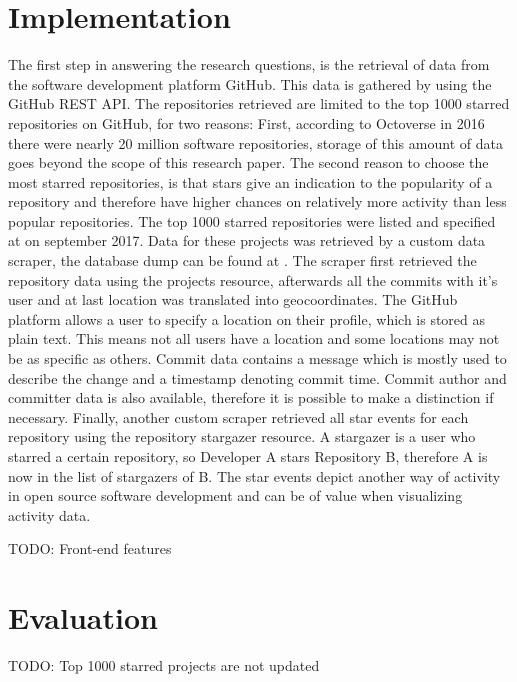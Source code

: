 \documentclass[acmtog, authorversion]{acmart}
\begin{document}
\section{Implementation}
The first step in answering the research questions, is the retrieval of data from the software development platform GitHub.
This data is gathered by using the GitHub REST API\cite{GHAPI}.
The repositories retrieved are limited to the top 1000 starred repositories on GitHub, for two reasons:
First, according to Octoverse \cite{GHOctoverse} in 2016 there were nearly 20 million software repositories, storage of this amount of data goes beyond the scope of this research paper.
The second reason to choose the most starred repositories, is that stars give an indication to the popularity of a repository and therefore have higher chances on relatively more activity than less popular repositories.
The top 1000 starred repositories were listed and specified at \cite{gitstar} on september 2017.
Data for these projects was retrieved by a custom data scraper, the database dump can be found at  \cite{githubvisualizerovertime}.
The scraper first retrieved the repository data using the projects resource\cite{GHAPI}, afterwards all the commits with it’s user and at last location was translated into geocoordinates.
The GitHub platform allows a user to specify a location on their profile, which is stored as plain text.
This means not all users have a location and some locations may not be as specific as others.
Commit data contains a message which is mostly used to describe the change and a timestamp denoting commit time.
Commit author and committer data is also available, therefore it is possible to make a distinction if necessary.
Finally, another custom scraper retrieved all star events for each repository using the repository stargazer resource\cite{GHAPI}.
A stargazer is a user who starred a certain repository, so Developer A stars Repository B, therefore A is now in the list of stargazers of B.
The star events depict another way of activity in open source software development and can be of value when visualizing activity data.

TODO: Front-end features


\section{Evaluation}
TODO: Top 1000 starred projects are not updated
\end{document}
